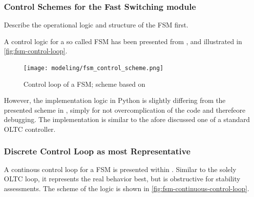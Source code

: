 \subsubsection{Control Schemes for the Fast Switching module}
Describe the operational logic and structure of the \acf{FSM} first.

A control logic for a so called \acs{FSM} has been presented from \textcite{burlakinEnhancedVoltageControl2024}, and illustrated in \autoref{fig:fsm-control-loop}.

\begin{figure}[htb!]
        \centering
        \texttt{[image: modeling/fsm\_control\_scheme.png]}
        \caption[Control loop of a \acf{FSM}]{Control loop of a \acs{FSM}; scheme based on \textcite{burlakinEnhancedVoltageControl2024}}
        \label{fig:fsm-control-loop}
\end{figure}

However, the implementation logic in Python is slightly differing from the presented scheme in \autocite{burlakinEnhancedVoltageControl2024}, simply for not overcomplication of the code and therefeore debugging. The implementation is similar to the afore discussed one of a standard \acs{OLTC} controller. 


\subsubsection{Discrete Control Loop as most Representative}
A continous control loop for a \acs{FSM} is presented within \textcite{burlakinEnhancedVoltageControl2024,burlakinEnhancingVariableShunt2024}. Similar to the solely \acs{OLTC} loop, it represents the real behavior best, but is obstructive for stability assessments. The scheme of the logic is shown in \autoref{fig:fsm-continuous-control-loop}.

